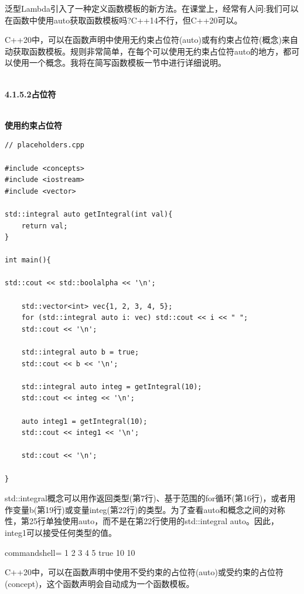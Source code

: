 泛型Lambda引入了一种定义函数模板的新方法。在课堂上，经常有人问:我们可以在函数中使用auto获取函数模板吗?C++14不行，但C++20可以。

C++20中，可以在函数声明中使用无约束占位符(auto)或有约束占位符(概念)来自动获取函数模板。规则非常简单，在每个可以使用无约束占位符auto的地方，都可以使用一个概念。我将在简写函数模板一节中进行详细说明。

\hspace*{\fill} \\ %
\noindent
\textbf{4.1.5.2\hspace{0.2cm}占位符}

\hspace*{\fill} \\ %
\noindent
\textbf{使用约束占位符}
\begin{lstlisting}[style=styleCXX]
// placeholders.cpp

#include <concepts>
#include <iostream>
#include <vector>

std::integral auto getIntegral(int val){
	return val;
}

int main(){

std::cout << std::boolalpha << '\n';

	std::vector<int> vec{1, 2, 3, 4, 5};
	for (std::integral auto i: vec) std::cout << i << " ";
	std::cout << '\n';

	std::integral auto b = true;
	std::cout << b << '\n';

	std::integral auto integ = getIntegral(10);
	std::cout << integ << '\n';

	auto integ1 = getIntegral(10);
	std::cout << integ1 << '\n';

	std::cout << '\n';

}
\end{lstlisting}

std::integral概念可以用作返回类型(第7行)、基于范围的for循环(第16行)，或者用作变量b(第19行)或变量integ(第22行)的类型。为了查看auto和概念之间的对称性，第25行单独使用auto，而不是在第22行使用的std::integral auto。因此，integ1可以接受任何类型的值。

\begin{tcblisting}{commandshell={}}
1 2 3 4 5
true
10
10
\end{tcblisting}


C++20中，可以在函数声明中使用不受约束的占位符(auto)或受约束的占位符(concept)，这个函数声明会自动成为一个函数模板。

